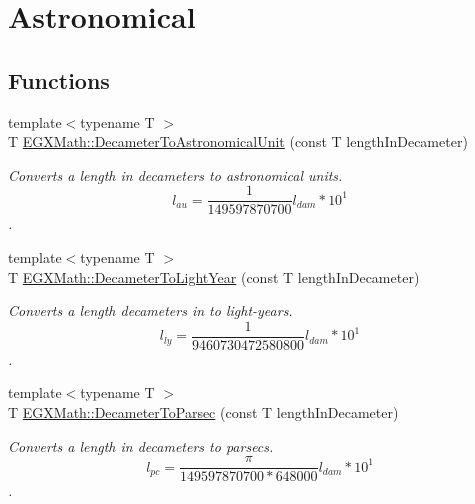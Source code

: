 \hypertarget{group___e_g_x_math-_conversions-_length_conversions-_decameter-_astronomical}{}\section{Astronomical}
\label{group___e_g_x_math-_conversions-_length_conversions-_decameter-_astronomical}
\subsection*{Functions}
\begin{DoxyCompactItemize}
\item 
{\footnotesize template$<$typename T $>$ }\\T \mbox{\hyperlink{group___e_g_x_math-_conversions-_length_conversions-_decameter-_astronomical_ga04365d1ba4f6dc4e7a607d720ccd807b}{E\+G\+X\+Math\+::\+Decameter\+To\+Astronomical\+Unit}} (const T length\+In\+Decameter)
\begin{DoxyCompactList}\small\item\em Converts a length in decameters to astronomical units. \[ l_{au}= \frac{1}{149597870700} l_{dam} * 10^{1} \]. \end{DoxyCompactList}\item 
{\footnotesize template$<$typename T $>$ }\\T \mbox{\hyperlink{group___e_g_x_math-_conversions-_length_conversions-_decameter-_astronomical_gaf31492b0cfcc0ec057856854376a2ba6}{E\+G\+X\+Math\+::\+Decameter\+To\+Light\+Year}} (const T length\+In\+Decameter)
\begin{DoxyCompactList}\small\item\em Converts a length decameters in to light-\/years. \[ l_{ly}= \frac{1}{9460730472580800} l_{dam} * 10^{1} \]. \end{DoxyCompactList}\item 
{\footnotesize template$<$typename T $>$ }\\T \mbox{\hyperlink{group___e_g_x_math-_conversions-_length_conversions-_decameter-_astronomical_ga50cf188f39f408c283b9a696ec44cee1}{E\+G\+X\+Math\+::\+Decameter\+To\+Parsec}} (const T length\+In\+Decameter)
\begin{DoxyCompactList}\small\item\em Converts a length in decameters to parsecs. \[ l_{pc}=\frac{\pi}{149597870700 * 648000} l_{dam} * 10^{1} \]. \end{DoxyCompactList}\end{DoxyCompactItemize}


